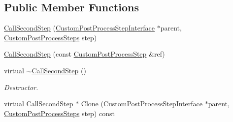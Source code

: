\subsection*{Public Member Functions}
\begin{DoxyCompactItemize}
\item 
\mbox{\hyperlink{class_geometry_engine_1_1_custom_shading_1_1_call_second_step_af361c6d6557602e99d03ea7d2c7ea8e1}{Call\+Second\+Step}} (\mbox{\hyperlink{class_geometry_engine_1_1_custom_shading_1_1_custom_post_process_step_interface}{Custom\+Post\+Process\+Step\+Interface}} $\ast$parent, \mbox{\hyperlink{namespace_geometry_engine_1_1_custom_shading_a09e44ca81de5fe08c6d50271d680c4b1}{Custom\+Post\+Process\+Steps}} step)
\item 
\mbox{\hyperlink{class_geometry_engine_1_1_custom_shading_1_1_call_second_step_a7ee78b6a2c0d3cf710ed6f136445eac8}{Call\+Second\+Step}} (const \mbox{\hyperlink{class_geometry_engine_1_1_custom_shading_1_1_custom_post_process_step}{Custom\+Post\+Process\+Step}} \&ref)
\item 
\mbox{\label{class_geometry_engine_1_1_custom_shading_1_1_call_second_step_ad8da5521ed66430acb866c7894b7817e}} 
virtual \mbox{\hyperlink{class_geometry_engine_1_1_custom_shading_1_1_call_second_step_ad8da5521ed66430acb866c7894b7817e}{$\sim$\+Call\+Second\+Step}} ()
\begin{DoxyCompactList}\small\item\em Destructor. \end{DoxyCompactList}\item 
virtual \mbox{\hyperlink{class_geometry_engine_1_1_custom_shading_1_1_call_second_step}{Call\+Second\+Step}} $\ast$ \mbox{\hyperlink{class_geometry_engine_1_1_custom_shading_1_1_call_second_step_ae8f56f4c458d1916198fe5c2cdd3b9e9}{Clone}} (\mbox{\hyperlink{class_geometry_engine_1_1_custom_shading_1_1_custom_post_process_step_interface}{Custom\+Post\+Process\+Step\+Interface}} $\ast$parent, \mbox{\hyperlink{namespace_geometry_engine_1_1_custom_shading_a09e44ca81de5fe08c6d50271d680c4b1}{Custom\+Post\+Process\+Steps}} step) const
\end{DoxyCompactItemize}
